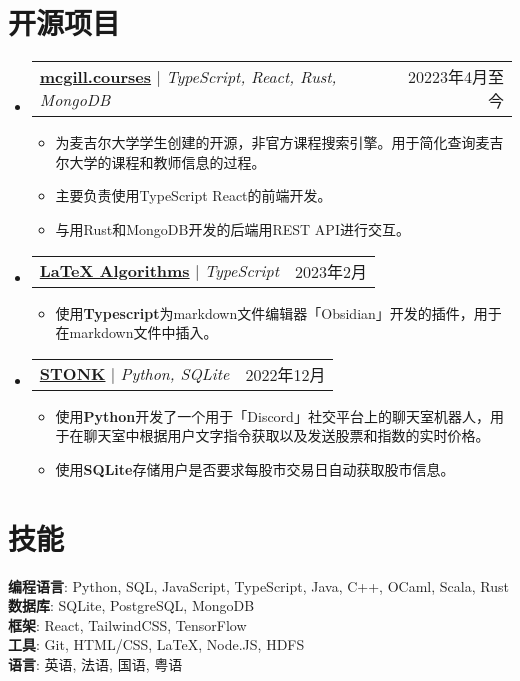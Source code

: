 \documentclass[letterpaper,11pt]{article}
\makeatletter
\newcommand{\resumeItem}[1]{
  \item\small{
    {#1 \vspace{-2pt}}
  }
}
\newcommand{\resumeProjectHeading}[2]{
  \item
  \begin{tabular*}{0.97\textwidth}{l@{\extracolsep{\fill}}r}
    \small#1 & #2 \\
  \end{tabular*}\vspace{-7pt}
}
\newcommand{\resumeSubHeadingListStart}{\begin{itemize}[leftmargin=0.15in, label={}]}
\newcommand{\resumeSubHeadingListEnd}{\end{itemize}}
\newcommand{\resumeItemListStart}{\begin{itemize}}
\newcommand{\resumeItemListEnd}{\end{itemize}\vspace{-5pt}}
\makeatother
\begin{document}
\begin{CJK*}{UTF8}{gbsn}
  \section{开源项目}
  \resumeSubHeadingListStart
  \resumeProjectHeading
  {\href{https://github.com/SamZhang02/DrooVE}{\textbf{mcgill.courses}} $|$ \emph{TypeScript, React, Rust, MongoDB}}{20223年4月至今}
  \resumeItemListStart
  \resumeItem{为麦吉尔大学学生创建的开源，非官方课程搜索引擎。用于简化查询麦吉尔大学的课程和教师信息的过程。}
  \resumeItem{主要负责使用TypeScript React的前端开发。}
  \resumeItem{与用Rust和MongoDB开发的后端用REST API进行交互。}
  \resumeItemListEnd
  \resumeProjectHeading
  {\href{https://github.com/SamZhang02/obsidian-latex-algorithms}{\textbf{LaTeX Algorithms}} $|$ \emph{TypeScript}}{2023年2月}
  \resumeItemListStart
  \resumeItem{使用\textbf{Typescript}为markdown文件编辑器「Obsidian」开发的插件，用于在markdown文件中插入\LaTeX格式的数学证明与算法。}
  \resumeItemListEnd
  \resumeProjectHeading
  {\href{https://github.com/SamZhang02/STONK}{\textbf{STONK}} $|$ \emph{Python, SQLite}}{2022年12月}
  \resumeItemListStart
  \resumeItem{使用\textbf{Python}开发了一个用于「Discord」社交平台上的聊天室机器人，用于在聊天室中根据用户文字指令获取以及发送股票和指数的实时价格。}
  \resumeItem{使用\textbf{SQLite}存储用户是否要求每股市交易日自动获取股市信息。}
  \resumeItemListEnd
  \resumeSubHeadingListEnd

  \section{技能}
  \begin{itemize}[leftmargin=0.15in, label={}]
    \small{\item{
                  \textbf{编程语言}{: Python, SQL, JavaScript, TypeScript, Java, C++, OCaml, Scala, Rust} \\
                  \textbf{数据库}{: SQLite, PostgreSQL, MongoDB}\\
                  \textbf{框架}{: React, TailwindCSS, TensorFlow}\\
                  \textbf{工具}{: Git, HTML/CSS, \LaTeX, Node.JS, HDFS}\\
                  \textbf{语言}{: 英语, 法语, 国语, 粤语}\\
            }}
  \end{itemize}


\end{CJK*}
\end{document}
